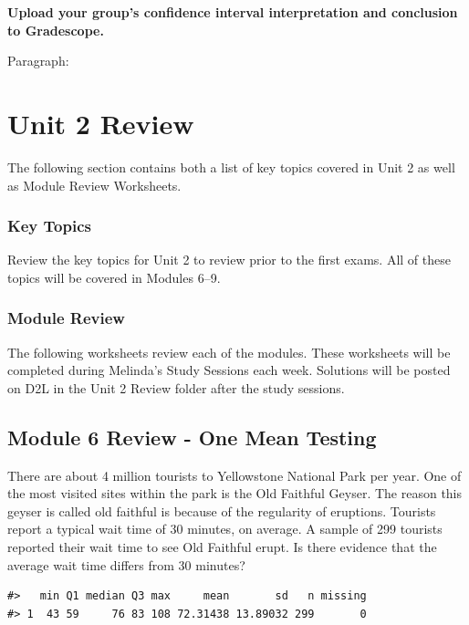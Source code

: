 \documentclass[
]{report}
\begin{document}
\textbf{Upload your group's confidence interval interpretation and conclusion to Gradescope.}

\newpage

Paragraph:

\newpage

\chapter{Unit 2 Review}\label{unit-2-review}

The following section contains both a list of key topics covered in Unit 2 as well as Module Review Worksheets.

\subsection{Key Topics}\label{key-topics-4}

Review the key topics for Unit 2 to review prior to the first exams. All of these topics will be covered in Modules 6--9.

\subsection{Module Review}\label{module-review}


The following worksheets review each of the modules. These worksheets will be completed during Melinda's Study Sessions each week. Solutions will be posted on D2L in the Unit 2 Review folder after the study sessions.

\newpage

\section{Module 6 Review - One Mean Testing}\label{module-6-review---one-mean-testing}

There are about 4 million tourists to Yellowstone National Park per year. One of the most visited sites within the park is the Old Faithful Geyser. The reason this geyser is called old faithful is because of the regularity of eruptions. Tourists report a typical wait time of 30 minutes, on average. A sample of 299 tourists reported their wait time to see Old Faithful erupt. Is there evidence that the average wait time differs from 30 minutes?

\begin{verbatim}
#>   min Q1 median Q3 max     mean       sd   n missing
#> 1  43 59     76 83 108 72.31438 13.89032 299       0
\end{verbatim}
\end{document}
